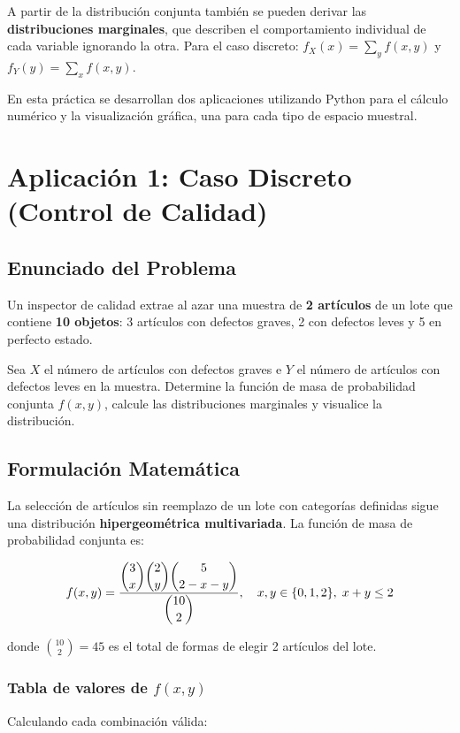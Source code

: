 \documentclass[12pt,a4paper]{article}
\begin{document}
A partir de la distribución conjunta también se pueden derivar las \textbf{distribuciones marginales}, que describen el comportamiento individual de cada variable ignorando la otra. Para el caso discreto: $f_X(x) = \sum_y f(x,y)$ y $f_Y(y) = \sum_x f(x,y)$.
 
En esta práctica se desarrollan dos aplicaciones utilizando Python para el cálculo numérico y la visualización gráfica, una para cada tipo de espacio muestral.
 
\newpage
\section{Aplicación 1: Caso Discreto (Control de Calidad)}
 
\subsection{Enunciado del Problema}
Un inspector de calidad extrae al azar una muestra de \textbf{2 artículos} de un lote que contiene \textbf{10 objetos}: 3 artículos con defectos graves, 2 con defectos leves y 5 en perfecto estado.
 
Sea $X$ el número de artículos con defectos graves e $Y$ el número de artículos con defectos leves en la muestra. Determine la función de masa de probabilidad conjunta $f(x, y)$, calcule las distribuciones marginales y visualice la distribución.
 
\subsection{Formulación Matemática}
 
La selección de artículos sin reemplazo de un lote con categorías definidas sigue una distribución \textbf{hipergeométrica multivariada}. La función de masa de probabilidad conjunta es:
 
\[
f(x, y) = \frac{\dbinom{3}{x} \dbinom{2}{y} \dbinom{5}{2-x-y}}{\dbinom{10}{2}}, \quad x, y \in \{0, 1, 2\},\; x + y \leq 2
\]
 
donde $\binom{10}{2} = 45$ es el total de formas de elegir 2 artículos del lote.
 
\subsubsection*{Tabla de valores de $f(x,y)$}
 
Calculando cada combinación válida:
 
\end{document}
